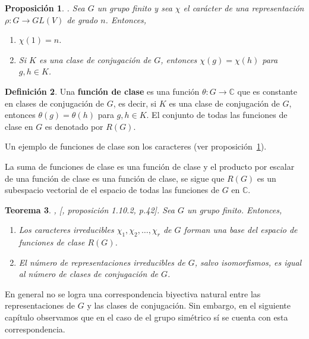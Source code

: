 \documentclass[12pt]{book}
\newtheorem{theorem}{Teorema}[section]
\newtheorem{proposition}[theorem]{Proposición}
\theoremstyle{definition}
\newtheorem{definition}[theorem]{Definición}
\newcounter{in}
\newcounter{ini}
\begin{document}
\begin{proposition}{}.
  Sea $G$ un grupo finito y sea $\chi$ el carácter de una
  representación $\rho:G\rightarrow GL(V)$ de grado $n$. Entonces,
  \begin{enumerate}
  \item $\chi(1)=n$.
  \item Si $K$ es una clase de conjugación de $G$, entonces $\chi(g)=\chi(h)$ para $g,h\in K$. 
  \end{enumerate}
\label{carac-const}
\end{proposition}
\begin{definition}
  Una \textbf{función de clase} es una función
  $\theta:G\rightarrow\mathbb{C}$ que es constante en clases de
  conjugación de $G$, es decir, si $K$ es una clase de conjugación de
  $G$, entonces $\theta(g)=\theta(h)$ para $g,h\in K$. El conjunto de
  todas las funciones de clase en $G$ es denotado por $R(G)$.
\end{definition} 
Un ejemplo de funciones de clase son los caracteres (ver proposición~\ref{carac-const}).

La suma de funciones de clase es una función de clase y el
producto por escalar de una función de clase es una función de clase,
se sigue que $R(G)$ es un subespacio vectorial de el
espacio de todas las funciones  de $G$ en $\mathbb{C}$.
\begin{theorem}{, [\cite{sagan2001symmetric}, proposición 1.10.2, p.42]}.
  \label{no-rep-irr-no-cla-conj}
  Sea $G$ un grupo finito. Entonces,
  \begin{enumerate}
  \item Los caracteres irreducibles
    $\chi_{1},\chi_{2},\ldots,\chi_{r}$ de $G$ forman una base del
    espacio de funciones de clase $R(G)$.
    \item El número de representaciones irreducibles de $G$, salvo
      isomorfismos, es igual al número de clases de conjugación de $G$.
  \end{enumerate}
\end{theorem}
En general no se logra una correspondencia biyectiva natural entre las
representaciones de $G$ y las clases de conjugación. Sin embargo, en
el siguiente capítulo observamos que en el caso de el grupo simétrico sí se cuenta con
esta correspondencia.
\end{document}
